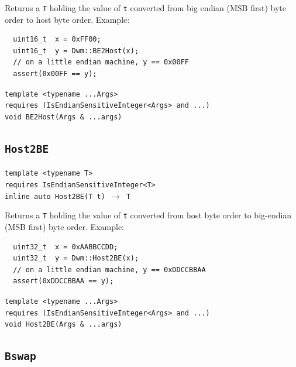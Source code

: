 Returns a \texttt{T} holding the value of \texttt{t} converted from
big endian (MSB first) byte order to host byte order.  Example:
\begin{verbatim}
  uint16_t  x = 0xFF00;
  uint16_t  y = Dwm::BE2Host(x);
  // on a little endian machine, y == 0x00FF
  assert(0x00FF == y);
\end{verbatim}

\texttt{template <typename ...Args>\\
requires (IsEndianSensitiveInteger<Args> and ...)\\
void BE2Host(Args \& ...args)}

\subsection{\texttt{Host2BE}}
\texttt{template <typename T>\\
requires IsEndianSensitiveInteger<T>\\
inline auto Host2BE(T t) $\rightarrow$ T}

Returns a \texttt{T} holding the value of \texttt{t} converted from
host byte order to big-endian (MSB first) byte order.  Example:
\begin{verbatim}
  uint32_t  x = 0xAABBCCDD;
  uint32_t  y = Dwm::Host2BE(x);
  // on a little endian machine, y == 0xDDCCBBAA
  assert(0xDDCCBBAA == y);
\end{verbatim}

\texttt{template <typename ...Args>\\
requires (IsEndianSensitiveInteger<Args> and ...)\\
void Host2BE(Args \& ...args)}

\subsection{\texttt{Bswap}}
